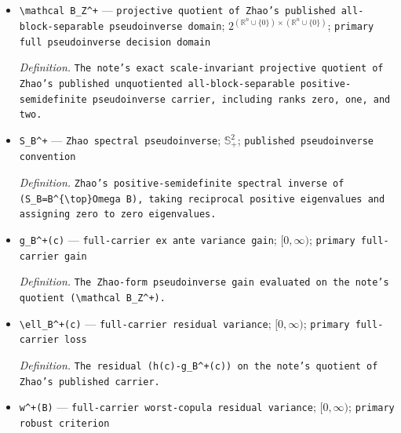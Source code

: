 \documentclass{article}
\begin{document}
\begin{itemize}
  \par\smallskip\noindent\emph{Definition.} The set \(\widehat{\mathcal A}_{\mathrm{mm}}=\operatorname*{argmin}_{B\in\mathcal B_\kappa}\widehat w(B)\).
  \item \texttt{\textbackslash{}\allowbreak{}mathcal B\_\allowbreak{}Z\textasciicircum{}+\allowbreak{}} --- \texttt{projective quotient of Zhao's published all-\allowbreak{}block-\allowbreak{}separable pseudoinverse domain}; \(2^{(\mathbb R^n\cup\{0\})\times(\mathbb R^n\cup\{0\})}\); \texttt{primary full pseudoinverse decision domain}
  \par\smallskip\noindent\emph{Definition.} \texttt{The note's exact scale-\allowbreak{}invariant projective quotient of Zhao's published unquotiented all-\allowbreak{}block-\allowbreak{}separable positive-\allowbreak{}semidefinite pseudoinverse carrier,\allowbreak{} including ranks zero,\allowbreak{} one,\allowbreak{} and two.}
  \item \texttt{S\_\allowbreak{}B\textasciicircum{}+\allowbreak{}} --- \texttt{Zhao spectral pseudoinverse}; \(\mathbb S_+^2\); \texttt{published pseudoinverse convention}
  \par\smallskip\noindent\emph{Definition.} \texttt{Zhao's positive-\allowbreak{}semidefinite spectral inverse of (S\_\allowbreak{}B=\allowbreak{}B\textasciicircum{}\{\textbackslash{}\allowbreak{}top\}\allowbreak{}Omega B),\allowbreak{} taking reciprocal positive eigenvalues and assigning zero to zero eigenvalues.}
  \item \texttt{g\_\allowbreak{}B\textasciicircum{}+\allowbreak{}(c)} --- \texttt{full-\allowbreak{}carrier ex ante variance gain}; \([0,\infty)\); \texttt{primary full-\allowbreak{}carrier gain}
  \par\smallskip\noindent\emph{Definition.} \texttt{The Zhao-\allowbreak{}form pseudoinverse gain evaluated on the note's quotient (\textbackslash{}\allowbreak{}mathcal B\_\allowbreak{}Z\textasciicircum{}+\allowbreak{}).}
  \item \texttt{\textbackslash{}\allowbreak{}ell\_\allowbreak{}B\textasciicircum{}+\allowbreak{}(c)} --- \texttt{full-\allowbreak{}carrier residual variance}; \([0,\infty)\); \texttt{primary full-\allowbreak{}carrier loss}
  \par\smallskip\noindent\emph{Definition.} \texttt{The residual (h(c)-\allowbreak{}g\_\allowbreak{}B\textasciicircum{}+\allowbreak{}(c)) on the note's quotient of Zhao's published carrier.}
  \item \texttt{w\textasciicircum{}+\allowbreak{}(B)} --- \texttt{full-\allowbreak{}carrier worst-\allowbreak{}copula residual variance}; \([0,\infty)\); \texttt{primary robust criterion}

\end{itemize}
\end{document}
